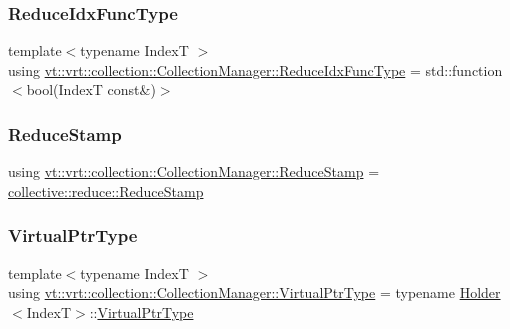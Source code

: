\subsubsection{\texorpdfstring{Reduce\+Idx\+Func\+Type}{ReduceIdxFuncType}}
{\footnotesize\ttfamily template$<$typename IndexT $>$ \\
using \hyperlink{structvt_1_1vrt_1_1collection_1_1_collection_manager_a47a3227ae0195c15187e8dc8762f66c4}{vt\+::vrt\+::collection\+::\+Collection\+Manager\+::\+Reduce\+Idx\+Func\+Type} =  std\+::function$<$bool(IndexT const\&)$>$}

\mbox{\label{structvt_1_1vrt_1_1collection_1_1_collection_manager_ae8aac19e0ae07e9225142e5880eac830}} 
\subsubsection{\texorpdfstring{Reduce\+Stamp}{ReduceStamp}}
{\footnotesize\ttfamily using \hyperlink{structvt_1_1vrt_1_1collection_1_1_collection_manager_ae8aac19e0ae07e9225142e5880eac830}{vt\+::vrt\+::collection\+::\+Collection\+Manager\+::\+Reduce\+Stamp} =  \hyperlink{namespacevt_1_1collective_1_1reduce_a7b7cb3021ac5654d92825d9fab0250b2}{collective\+::reduce\+::\+Reduce\+Stamp}}

\mbox{\label{structvt_1_1vrt_1_1collection_1_1_collection_manager_a086cab4af6af4f869fbf8814c3a9a6a4}} 
\subsubsection{\texorpdfstring{Virtual\+Ptr\+Type}{VirtualPtrType}}
{\footnotesize\ttfamily template$<$typename IndexT $>$ \\
using \hyperlink{structvt_1_1vrt_1_1collection_1_1_collection_manager_a086cab4af6af4f869fbf8814c3a9a6a4}{vt\+::vrt\+::collection\+::\+Collection\+Manager\+::\+Virtual\+Ptr\+Type} =  typename \hyperlink{structvt_1_1vrt_1_1collection_1_1_holder}{Holder}$<$IndexT$>$\+::\hyperlink{structvt_1_1vrt_1_1collection_1_1_collection_manager_a086cab4af6af4f869fbf8814c3a9a6a4}{Virtual\+Ptr\+Type}}



